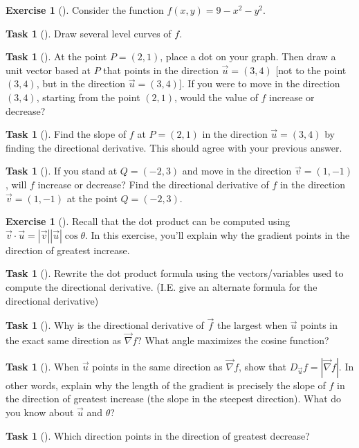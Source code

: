\documentclass[10pt,]{book}
\theoremstyle{plain}
\theoremstyle{definition}
\theoremstyle{definition}
\theoremstyle{definition}
\theoremstyle{definition}
\newtheorem{exploration}[project]{Exercise}
\newtheorem{task}[project]{Task}
\theoremstyle{definition}
\numberwithin{equation}{section}
\begin{document}
\begin{exploration}[]\label{exploration-228}
Consider the function \(f(x,y) = 9-x^2-y^2\).%
\begin{task}[]\label{task-605}
Draw several level curves of \(f\).%
\end{task}
\begin{task}[]\label{task-606}
At the point \(P=(2,1)\), place a dot on your graph. Then draw a unit vector based at \(P\) that points in the direction \(\vec u=(3,4)\) [not to the point \((3,4)\), but in the direction \(\vec u=(3,4)\)]. If you were to move in the direction \((3,4)\), starting from the point \((2,1)\), would the value of \(f\) increase or decrease?%
\end{task}
\begin{task}[]\label{task-607}
Find the slope of \(f\) at \(P=(2,1)\) in the direction \(\vec u=(3,4)\) by finding the directional derivative. This should agree with your previous answer.%
\end{task}
\begin{task}[]\label{task-608}
If you stand at \(Q=(-2,3)\) and move in the direction \(\vec v= (1,-1)\), will \(f\) increase or decrease?  Find the directional derivative of \(f\) in the direction \(\vec v=(1,-1)\) at the point \(Q=(-2,3)\).%
\end{task}
\end{exploration}
\begin{exploration}[]\label{exploration-229}
Recall that the dot product can be computed using \(\vec{v} \cdot \vec{u} = |\vec{v}||\vec{u}|\cos \theta\). In this exercise, you'll explain why the gradient points in the direction of greatest increase.%
\begin{task}[]\label{task-609}
Rewrite the dot product formula using the vectors/variables used to compute the directional derivative. (I.E. give an alternate formula for the directional derivative)%
\end{task}
\begin{task}[]\label{task-610}
Why is the directional derivative of \(\vec f\) the largest when \(\vec u\) points in the exact same direction as \(\vec \nabla f\)? What angle maximizes the cosine function?%
%
\end{task}
\begin{task}[]\label{task-611}
When \(\vec u\) points in the same direction as \(\vec \nabla f\), show that \(D_{\vec u}f = |\vec \nabla f|\). In other words, explain why the length of the gradient is precisely the slope of \(f\) in the direction of greatest increase (the slope in the steepest direction). What do you know about \(\vec{u}\) and \(\theta\)?%
%
\end{task}
\begin{task}[]\label{task-612}
Which direction points in the direction of greatest decrease?%
\end{task}
\end{exploration}
\end{document}
